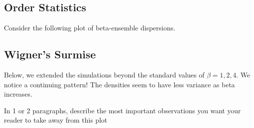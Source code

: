 \subsection{Order Statistics}

Consider the following plot of beta-ensemble dispersions.


\newpage
\subsection{Wigner's Surmise}


Below, we extended the simulations beyond the standard values of $\beta = 1,2,4$. We notice a continuing pattern! The densities seem to have less variance as
beta increases.




In 1 or 2 paragraphs, describe the most important observations you want your reader to take away from this plot
